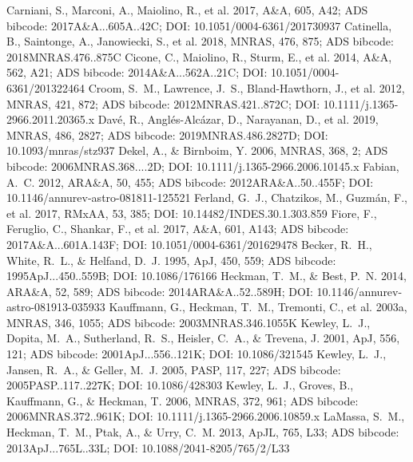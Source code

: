 \documentclass[twocolumn]{aastex631}
\begin{document}
\begin{thebibliography}{}
 Carniani, S., Marconi, A., Maiolino, R., et al. 2017, A\&A, 605, A42; ADS bibcode: 2017A\&A...605A..42C; DOI: 10.1051/0004-6361/201730937
 Catinella, B., Saintonge, A., Janowiecki, S., et al. 2018, MNRAS, 476, 875; ADS bibcode: 2018MNRAS.476..875C
 Cicone, C., Maiolino, R., Sturm, E., et al. 2014, A\&A, 562, A21; ADS bibcode: 2014A\&A...562A..21C; DOI: 10.1051/0004-6361/201322464
 Croom, S.~M., Lawrence, J.~S., Bland-Hawthorn, J., et al. 2012, MNRAS, 421, 872; ADS bibcode: 2012MNRAS.421..872C; DOI: 10.1111/j.1365-2966.2011.20365.x
 Dav{\'e}, R., Angl{\'e}s-Alc{\'a}zar, D., Narayanan, D., et al. 2019, MNRAS, 486, 2827; ADS bibcode: 2019MNRAS.486.2827D; DOI: 10.1093/mnras/stz937
 Dekel, A., \& Birnboim, Y. 2006, MNRAS, 368, 2; ADS bibcode: 2006MNRAS.368....2D; DOI: 10.1111/j.1365-2966.2006.10145.x
 Fabian, A.~C. 2012, ARA\&A, 50, 455; ADS bibcode: 2012ARA\&A..50..455F; DOI: 10.1146/annurev-astro-081811-125521
 Ferland, G.~J., Chatzikos, M., Guzm\'an, F., et al. 2017, RMxAA, 53, 385; DOI: 10.14482/INDES.30.1.303.859
 Fiore, F., Feruglio, C., Shankar, F., et al. 2017, A\&A, 601, A143; ADS bibcode: 2017A\&A...601A.143F; DOI: 10.1051/0004-6361/201629478
 Becker, R.~H., White, R.~L., \& Helfand, D.~J. 1995, ApJ, 450, 559; ADS bibcode: 1995ApJ...450..559B; DOI: 10.1086/176166
 Heckman, T.~M., \& Best, P.~N. 2014, ARA\&A, 52, 589; ADS bibcode: 2014ARA\&A..52..589H; DOI: 10.1146/annurev-astro-081913-035933
 Kauffmann, G., Heckman, T.~M., Tremonti, C., et al. 2003a, MNRAS, 346, 1055; ADS bibcode: 2003MNRAS.346.1055K
 Kewley, L.~J., Dopita, M.~A., Sutherland, R.~S., Heisler, C.~A., \& Trevena, J. 2001, ApJ, 556, 121; ADS bibcode: 2001ApJ...556..121K; DOI: 10.1086/321545
 Kewley, L.~J., Jansen, R.~A., \& Geller, M.~J. 2005, PASP, 117, 227; ADS bibcode: 2005PASP..117..227K; DOI: 10.1086/428303
 Kewley, L.~J., Groves, B., Kauffmann, G., \& Heckman, T. 2006, MNRAS, 372, 961; ADS bibcode: 2006MNRAS.372..961K; DOI: 10.1111/j.1365-2966.2006.10859.x
 LaMassa, S.~M., Heckman, T.~M., Ptak, A., \& Urry, C.~M. 2013, ApJL, 765, L33; ADS bibcode: 2013ApJ...765L..33L; DOI: 10.1088/2041-8205/765/2/L33

\end{thebibliography}
\end{document}
